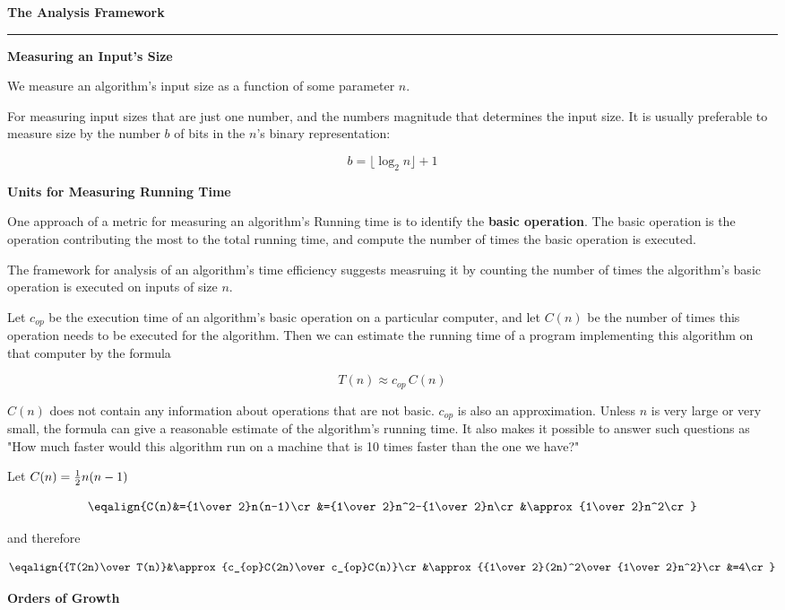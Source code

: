 {\bf The Analysis Framework}
\vskip 1mm
\hrule

\vskip 1cm
{\bf Measuring an Input's Size}

\vskip 1mm
We measure an algorithm's input size as a function of some parameter $n$.

\vskip 3mm
For measuring input sizes that are just one number, and the numbers magnitude that determines the input size. It is usually preferable to measure size by the number $b$ of bits in the $n$'s binary representation:

$$b=\lfloor\log_2 n\rfloor+1$$

\filbreak
\vskip 1cm
{\bf Units for Measuring Running Time}

\vskip 1mm
One approach of a metric for measuring an algorithm's Running time is to identify the {\bf basic operation}. The basic operation is the operation contributing the most to the total running time, and compute the number of times the basic operation is executed.

\vskip 3mm
The framework for analysis of an algorithm's time efficiency suggests measruing it by counting the number of times the algorithm's basic operation is executed on inputs of size $n$.

\vskip 3mm
Let $c_{op}$ be the execution time of an algorithm's basic operation on a particular computer, and let $C(n)$ be the number of times this operation needs to be executed for the algorithm. Then we can estimate the running time of a program implementing this algorithm on that computer by the formula

$$T(n)\approx c_{op}\,C(n)$$

\vskip 1mm
$C(n)$ does not contain any information about operations that are not basic. $c_{op}$ is also an approximation. Unless $n$ is very large or very small, the formula can give a reasonable estimate of the algorithm's running time. It also makes it possible to answer such questions as "How much faster would this algorithm run on a machine that is 10 times faster than the one we have?"

\vskip 3mm
Let $C(n)={1\over 2}n(n-1)$

$$\eqalign{C(n)&={1\over 2}n(n-1)\cr
		&={1\over 2}n^2-{1\over 2}n\cr
		&\approx {1\over 2}n^2\cr}$$

and therefore

$$\eqalign{{T(2n)\over T(n)}&\approx {c_{op}C(2n)\over c_{op}C(n)}\cr
		&\approx {{1\over 2}(2n)^2\over {1\over 2}n^2}\cr
		&=4\cr}$$

\filbreak
\vskip 1cm
{\bf Orders of Growth}

